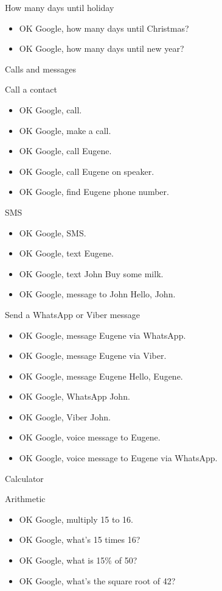 \documentclass[
  letterpaper,
  DIV=11,
  numbers=noendperiod]{scrartcl}
\providecommand{\tightlist}{%
  \setlength{\itemsep}{0pt}\setlength{\parskip}{0pt}}\usepackage{longtable,booktabs,array}
\begin{document}
How many days until holiday

\begin{itemize}
\tightlist
\item
  OK Google, how many days until Christmas?
\item
  OK Google, how many days until new year?
\end{itemize}

Calls and messages

Call a contact

\begin{itemize}
\tightlist
\item
  OK Google, call.
\item
  OK Google, make a call.
\item
  OK Google, call Eugene.
\item
  OK Google, call Eugene on speaker.
\item
  OK Google, find Eugene phone number.
\end{itemize}

SMS

\begin{itemize}
\tightlist
\item
  OK Google, SMS.
\item
  OK Google, text Eugene.
\item
  OK Google, text John Buy some milk.
\item
  OK Google, message to John Hello, John.
\end{itemize}

Send a WhatsApp or Viber message

\begin{itemize}
\tightlist
\item
  OK Google, message Eugene via WhatsApp.
\item
  OK Google, message Eugene via Viber.
\item
  OK Google, message Eugene Hello, Eugene.
\item
  OK Google, WhatsApp John.
\item
  OK Google, Viber John.
\item
  OK Google, voice message to Eugene.
\item
  OK Google, voice message to Eugene via WhatsApp.
\end{itemize}

Calculator

Arithmetic

\begin{itemize}
\tightlist
\item
  OK Google, multiply 15 to 16.
\item
  OK Google, what's 15 times 16?
\item
  OK Google, what is 15\% of 50?
\item
  OK Google, what's the square root of 42?
\end{itemize}
\end{document}
